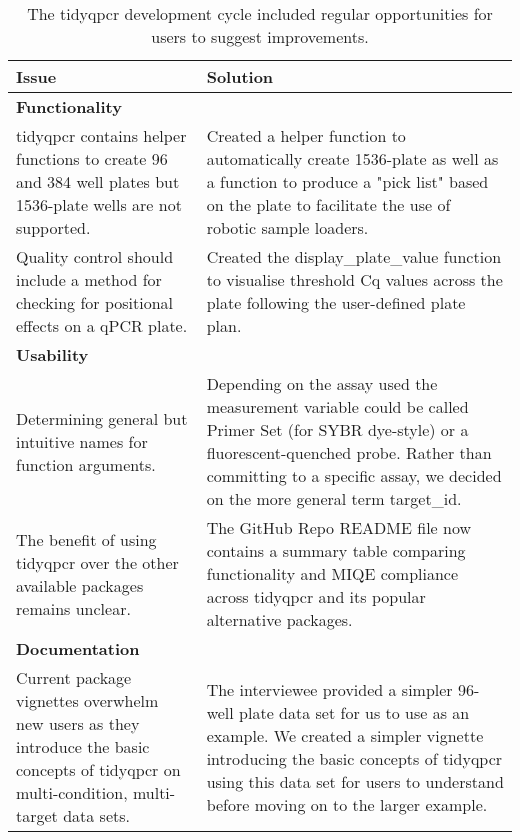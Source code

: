 \documentclass[../main.tex]{subfiles}
\begin{document}
\begin{table}
    \def\arraystretch{1.25}
\centering
\begin{tabular}{|| m{4.5cm} | m{7cm} ||} 
 \hline
 \textbf{\large Issue} & \textbf{\large Solution} \\ [0.5ex] 
 \hline\hline
 \multicolumn{2}{|l|}{\textbf{Functionality}} \\
 \hline
 tidyqpcr contains helper functions to create 96 and 384 well plates but 1536-plate wells are not supported. & 
 Created a helper function to automatically create 1536-plate as well as a function to produce a "pick list" based on the plate to facilitate the use of robotic sample loaders. \\ 
 \hline
 Quality control should include a method for checking for positional effects on a qPCR plate. & 
 Created the display\_plate\_value function to visualise threshold Cq values across the plate following the user-defined plate plan. \\
 \hline
 \multicolumn{2}{|l|}{\textbf{Usability}} \\
 \hline
 Determining general but intuitive names for function arguments. & 
 Depending on the assay used the measurement variable could be called Primer Set (for SYBR dye-style) or a fluorescent-quenched probe. 
 Rather than committing to a specific assay, we decided on the more general term target\_id. \\
 \hline
 The benefit of using tidyqpcr over the other available packages remains unclear. & 
 The GitHub Repo README file now contains a summary table comparing functionality and MIQE compliance across tidyqpcr and its popular alternative packages.\\
 \hline
 \multicolumn{2}{|l|}{\textbf{Documentation}} \\
 \hline
 Current package vignettes overwhelm new users as they introduce the basic concepts of tidyqpcr on multi-condition, multi-target data sets. & 
 The interviewee provided a simpler 96-well plate data set for us to use as an example. 
 We created a simpler vignette introducing the basic concepts of tidyqpcr using this data set for users to understand before moving on to the larger example. \\
 \hline
\end{tabular}
\caption[tidyqpcr's development included improvements  from user feedback.]{The tidyqpcr development cycle included regular opportunities for users to suggest improvements.}
\label{user-feedback}
\end{table}
\end{document}
